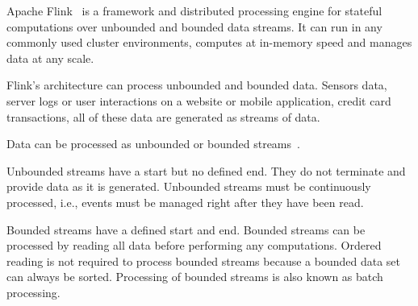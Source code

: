 Apache Flink~\cite{misc:ApacheFlink} is a framework and distributed processing engine for stateful computations over unbounded and bounded data streams. It can run in any commonly used cluster environments, computes at in-memory speed and manages data at any scale.

Flink’s architecture can process unbounded and bounded data. Sensors data, server logs or user interactions on a website or mobile application, credit card transactions, all of these data are generated as streams of data.

Data can be processed as unbounded or bounded streams~\cite{misc:ApacheFlinkArchitecture}. 

Unbounded streams have a start but no defined end. They do not terminate and provide data as it is generated. Unbounded streams must be continuously processed, i.e., events must be managed right after they have been read. %

Bounded streams have a defined start and end. Bounded streams can be processed by reading all data before performing any computations. Ordered reading is not required to process bounded streams because a bounded data set can always be sorted. Processing of bounded streams is also known as batch processing.




